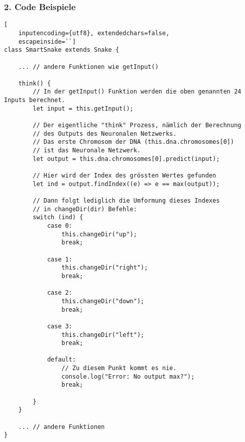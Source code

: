 \documentclass[10pt,a4paper,ngerman,english]{article}
\begin{document}
\subsubsection{2. Code Beispiele}

\begin{lstlisting}[
    inputencoding={utf8}, extendedchars=false,  
    escapeinside=``]
class SmartSnake extends Snake {

    ... // andere Funktionen wie getInput()

    think() {
        // In der getInput() Funktion werden die oben genannten 24 Inputs berechnet.
        let input = this.getInput(); 

        // Der eigentliche "think" Prozess, nämlich der Berechnung
        // des Outputs des Neuronalen Netzwerks.
        // Das erste Chromosom der DNA (this.dna.chromosomes[0])
        // ist das Neuronale Netzwerk.
        let output = this.dna.chromosomes[0].predict(input);       

        // Hier wird der Index des grössten Wertes gefunden
        let ind = output.findIndex((e) => e == max(output));

        // Dann folgt lediglich die Umformung dieses Indexes 
        // in changeDir(dir) Befehle:
        switch (ind) {
            case 0:
                this.changeDir("up");
                break;

            case 1:
                this.changeDir("right");
                break;

            case 2:
                this.changeDir("down");
                break;

            case 3:
                this.changeDir("left");
                break;

            default:
                // Zu diesem Punkt kommt es nie.
                console.log("Error: No output max?"); 
                break;

        }
    }
    
    ... // andere Funktionen
}
       
\end{lstlisting}
\end{document}
